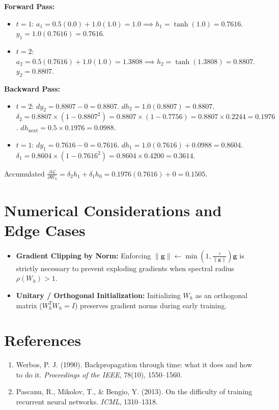 \documentclass[11pt,a4paper]{article}
\theoremstyle{definition}
\begin{document}
\textbf{Forward Pass:}
\begin{itemize}
    \item $t=1$: $a_1 = 0.5(0.0) + 1.0(1.0) = 1.0 \implies h_1 = \tanh(1.0) = 0.7616$. $y_1 = 1.0(0.7616) = 0.7616$.
    \item $t=2$: $a_2 = 0.5(0.7616) + 1.0(1.0) = 1.3808 \implies h_2 = \tanh(1.3808) = 0.8807$. $y_2 = 0.8807$.
\end{itemize}

\textbf{Backward Pass:}
\begin{itemize}
    \item $t=2$: $dy_2 = 0.8807 - 0 = 0.8807$.
    $dh_2 = 1.0(0.8807) = 0.8807$.
    $\delta_2 = 0.8807 \times (1 - 0.8807^2) = 0.8807 \times (1 - 0.7756) = 0.8807 \times 0.2244 = 0.1976$.
    $dh_{\text{next}} = 0.5 \times 0.1976 = 0.0988$.
    \item $t=1$: $dy_1 = 0.7616 - 0 = 0.7616$.
    $dh_1 = 1.0(0.7616) + 0.0988 = 0.8604$.
    $\delta_1 = 0.8604 \times (1 - 0.7616^2) = 0.8604 \times 0.4200 = 0.3614$.
\end{itemize}

Accumulated $\frac{\partial \mathcal{L}}{\partial W_h} = \delta_2 h_1 + \delta_1 h_0 = 0.1976(0.7616) + 0 = 0.1505$.

\section{Numerical Considerations and Edge Cases}

\begin{itemize}
    \item \textbf{Gradient Clipping by Norm:} Enforcing $\|\mathbf{g}\| \gets \min(1, \frac{\tau}{\|\mathbf{g}\|}) \mathbf{g}$ is strictly necessary to prevent exploding gradients when spectral radius $\rho(W_h) > 1$.
    \item \textbf{Unitary / Orthogonal Initialization:} Initializing $W_h$ as an orthogonal matrix ($W_h^T W_h = I$) preserves gradient norms during early training.
\end{itemize}

\section{References}
\begin{enumerate}
    \item Werbos, P. J. (1990). Backpropagation through time: what it does and how to do it. \emph{Proceedings of the IEEE}, 78(10), 1550--1560.
    \item Pascanu, R., Mikolov, T., \& Bengio, Y. (2013). On the difficulty of training recurrent neural networks. \emph{ICML}, 1310--1318.
\end{enumerate}
\end{document}
